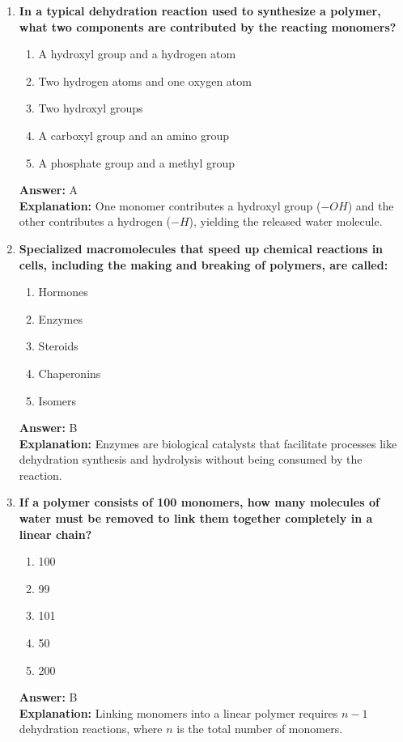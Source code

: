 \documentclass[11pt, a4paper]{article}
\begin{document}
\begin{enumerate}
\item \textbf{In a typical dehydration reaction used to synthesize a polymer, what two components are contributed by the reacting monomers?}
\begin{enumerate}[label=\Alph*.]
    \item A hydroxyl group and a hydrogen atom
    \item Two hydrogen atoms and one oxygen atom
    \item Two hydroxyl groups
    \item A carboxyl group and an amino group
    \item A phosphate group and a methyl group
\end{enumerate}
\textbf{Answer:} A \\
\textbf{Explanation:} One monomer contributes a hydroxyl group ($-OH$) and the other contributes a hydrogen ($-H$), yielding the released water molecule.

\item \textbf{Specialized macromolecules that speed up chemical reactions in cells, including the making and breaking of polymers, are called:}
\begin{enumerate}[label=\Alph*.]
    \item Hormones
    \item Enzymes
    \item Steroids
    \item Chaperonins
    \item Isomers
\end{enumerate}
\textbf{Answer:} B \\
\textbf{Explanation:} Enzymes are biological catalysts that facilitate processes like dehydration synthesis and hydrolysis without being consumed by the reaction.

\item \textbf{If a polymer consists of 100 monomers, how many molecules of water must be removed to link them together completely in a linear chain?}
\begin{enumerate}[label=\Alph*.]
    \item 100
    \item 99
    \item 101
    \item 50
    \item 200
\end{enumerate}
\textbf{Answer:} B \\
\textbf{Explanation:} Linking monomers into a linear polymer requires $n-1$ dehydration reactions, where $n$ is the total number of monomers.


\end{enumerate}
\end{document}
